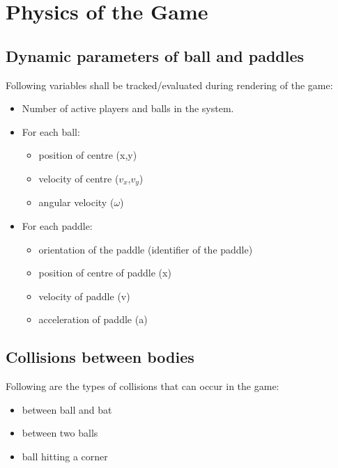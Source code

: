 \documentclass{article}
\begin{document}
\section{Physics of the Game}

\subsection{Dynamic parameters of ball and paddles}
Following variables shall be tracked/evaluated during rendering of the game:
\begin{itemize}
    \item Number of active players and balls in the system.
    \item For each ball:
    \begin{itemize}
        \item position of centre (x,y)
        \item velocity of centre ($v_x$,$v_y$)
        \item angular velocity ($\omega$)
    \end{itemize}
    \item For each paddle:
    \begin{itemize}
        \item orientation of the paddle (identifier of the paddle)
        \item position of centre of paddle (x)
        \item velocity of paddle (v)
        \item acceleration of paddle (a)
    \end{itemize}
\end{itemize}
\subsection{Collisions between bodies}

Following are the types of collisions that can occur in the game:
\begin{itemize}
    \item between ball and bat
    \item between two balls
    \item ball hitting a corner
\end{itemize}
\end{document}
